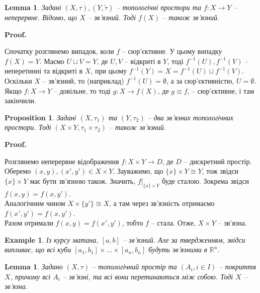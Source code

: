 \documentclass[a4paper, 10pt]{article}
\makeatletter
\theoremstyle{theoremdd}
\newtheorem{example}[theorem]{Example}
\newtheorem{proposition}[theorem]{Proposition}
\newtheorem{lemma}[theorem]{Lemma}
\renewenvironment{proof}[1][Proof.\\]{\par
\pushQED{\hfill \qed}%
\normalfont \topsep6\p@\@plus6\p@\relax
\trivlist
\item\relax
{\bfseries
#1\@addpunct{.}}\hspace\labelsep\ignorespaces
}{%
\popQED\endtrivlist\@endpefalse
}
\makeatother
\begin{document}
\begin{lemma}
Задані $(X,\tau), (Y,\tilde{\tau})$ -- топологічні простори та $f \colon X \to Y$ -- неперервне. Відомо, що $X$ -- зв'язний. Тоді $f(X)$ -- також зв'язний.
\end{lemma}

\begin{proof}
Спочатку розглянемо випадок, коли $f$ -- сюр'єктивне. У цьому випадку $f(X) = Y$. Маємо $U \sqcup V = Y$, де $U,V$ -- відкриті в $Y$, тоді $f^{-1}(U), f^{-1}(V)$ -- неперетинні та відкриті в $X$, при цьому $f^{-1}(Y) = X = f^{-1}(U) \sqcup f^{-1}(V)$. Оскільки $X$ -- зв'язний, то (наприклад) $f^{-1}(U) = \emptyset$, а за сюр'єктивністю, $U = \emptyset$.\\
Якщо $f \colon X \to Y$ -- довільне, то тоді $g \colon X \to f(X)$, де $g \equiv f$, -- сюр'єктивне, і там закінчили.
\end{proof}

\begin{proposition}
Задані $(X,\tau_1)$ та $(Y,\tau_2)$ -- два зв'язних топологічних простори. Тоді $(X \times Y, \tau_1 \times \tau_2)$ -- також зв'язний.
\end{proposition}

\begin{proof}
Розглянемо неперервне відображення $f \colon X \times Y \to D$, де $D$ -- дискретний простір. Оберемо $(x,y), (x',y') \in X \times Y$. Зауважимо, що $\{x\} \times Y \cong Y$, тож звідси $\{x\} \times Y$ має бути зв'язною також. Значить, $f|_{\{x\} \times Y}$ буде сталою. Зокрема звідси $f(x,y) = f(x,y')$.\\
Аналогічним чином $X \times \{y'\} \cong X$, а там через зв'язність отримаємо $f(x',y') = f(x,y')$.\\
Разом отримали $f(x,y) = f(x',y')$, тобто $f$ -- стала. Отже, $X \times Y$ -- зв'язна.
\end{proof}

\begin{example}
Із курсу матана, $[a,b]$ -- зв'язний. Але за твердженням, звідси випливає, що всі куби $[a_1, b_1] \times \dots \times [a_n, b_n]$ будуть зв'язними в $\mathbb{R}^n$.
\end{example}

\begin{lemma}
Задано $(X,\tau)$ -- топологічний простір та $(A_i, i \in I)$ -- покриття $X$, причому всі $A_i$ -- зв'язні, та всі вони перетинаються між собою. Тоді $X$ -- зв'язна.
\end{lemma}
\end{document}

